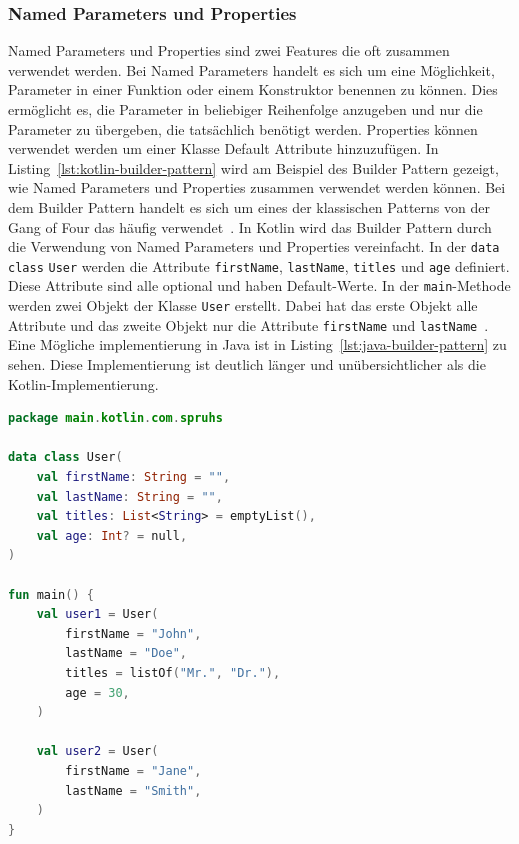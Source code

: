 \documentclass[11pt]{article}
\begin{document}
    \subsubsection{Named Parameters und Properties}
    Named Parameters und Properties sind zwei Features die oft zusammen verwendet werden.
    Bei Named Parameters handelt es sich um eine Möglichkeit, Parameter in einer Funktion oder einem Konstruktor benennen zu können.
    Dies ermöglicht es, die Parameter in beliebiger Reihenfolge anzugeben und nur die Parameter zu übergeben, die tatsächlich benötigt werden.
    Properties können verwendet werden um einer Klasse Default Attribute hinzuzufügen.
    In Listing~\ref{lst:kotlin-builder-pattern} wird am Beispiel des Builder Pattern gezeigt, wie Named Parameters und Properties zusammen verwendet werden können.
    Bei dem Builder Pattern handelt es sich um eines der klassischen Patterns von der Gang of Four das häufig verwendet~\cite{gang-of-four}.
    In Kotlin wird das Builder Pattern durch die Verwendung von Named Parameters und Properties vereinfacht.
    In der \texttt{data class} \texttt{User} werden die Attribute \texttt{firstName}, \texttt{lastName}, \texttt{titles} und \texttt{age} definiert.
    Diese Attribute sind alle optional und haben Default-Werte.
    In der \texttt{main}-Methode werden zwei Objekt der Klasse \texttt{User} erstellt.
    Dabei hat das erste Objekt alle Attribute und das zweite Objekt nur die Attribute \texttt{firstName} und \texttt{lastName}~\cite[46]{kotlin-patterns}.
    Eine Mögliche implementierung in Java ist in Listing~\ref{lst:java-builder-pattern} zu sehen.
    Diese Implementierung ist deutlich länger und unübersichtlicher als die Kotlin-Implementierung.

    \begin{lstlisting}[language=Kotlin, caption={Builder.kt}, label={lst:kotlin-builder-pattern}]
package main.kotlin.com.spruhs

data class User(
    val firstName: String = "",
    val lastName: String = "",
    val titles: List<String> = emptyList(),
    val age: Int? = null,
)

fun main() {
    val user1 = User(
        firstName = "John",
        lastName = "Doe",
        titles = listOf("Mr.", "Dr."),
        age = 30,
    )

    val user2 = User(
        firstName = "Jane",
        lastName = "Smith",
    )
}
    \end{lstlisting}
\end{document}

